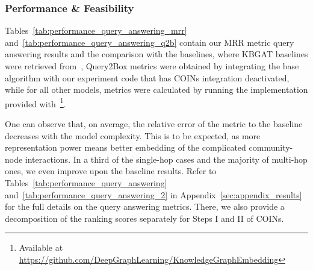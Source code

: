 \subsubsection{Performance \& Feasibility}

Tables~\ref{tab:performance_query_answering_mrr} and~\ref{tab:performance_query_answering_q2b} contain our MRR metric query answering results and the comparison with the baselines, where KBGAT baselines were retrieved from~\cite{nathani_learning_2019}, Query2Box metrics were obtained by integrating the base algorithm with our experiment code that has COINs integration deactivated, while for all other models, metrics were calculated by running the implementation provided with~\cite{sun_rotate_2019}\footnote{Available at \url{https://github.com/DeepGraphLearning/KnowledgeGraphEmbedding}}. 

One can observe that, on average, the relative error of the metric to the baseline decreases with the model complexity. This is to be expected, as more representation power means better embedding of the complicated community-node interactions. In a third of the single-hop cases and the majority of multi-hop ones, we even improve upon the baseline results. Refer to Tables~\ref{tab:performance_query_answering} and~\ref{tab:performance_query_answering_2} in Appendix~\ref{sec:appendix_results} for the full details on the query answering metrics. There, we also provide a decomposition of the ranking scores separately for Steps I and II of COINs.

